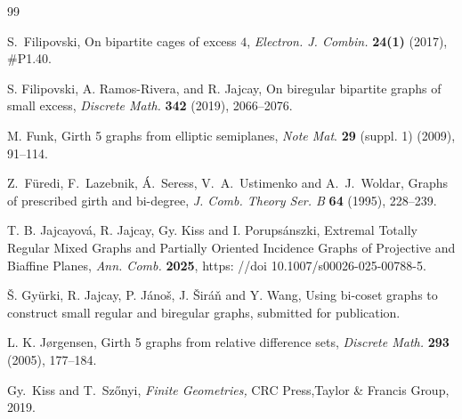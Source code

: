 \documentclass[a4paper,11pt]{article}
\begin{document}
\begin{thebibliography}{99}


S.\ Filipovski,
On bipartite cages of excess $4$,
{\em Electron. J. Combin.} {\bf 24(1)} (2017), \#P1.40.

S. Filipovski, A. Ramos-Rivera, and R. Jajcay, On biregular bipartite graphs of small excess,
{\em Discrete Math.} {\bf 342} (2019), 2066--2076. 


M. Funk,
Girth 5 graphs from elliptic semiplanes, 
{\em Note Mat}. {\bf 29} (suppl. 1) (2009), 91–114.

Z.\ F\" uredi, F.\ Lazebnik, \' A.\ Seress, V.\ A.\ Ustimenko and A.\ J.\ Woldar, 
Graphs of prescribed girth and bi-degree, 
{\em J. Comb. Theory Ser. B  } {\bf 64} (1995), 228--239.






T. B. Jajcayov{\'a}, R. Jajcay, Gy. Kiss and I. Porupsánszki,  
Extremal Totally Regular Mixed Graphs and Partially Oriented Incidence Graphs of Projective and Biaffine Planes, {\em Ann. Comb.} {\bf 2025},
https: //doi 10.1007/s00026-025-00788-5.

\v S. Gy\" urki, R. Jajcay, P. J\' ano\v s, J. \v Sir\' a\v n and Y. Wang, Using bi-coset graphs to construct 
small regular and biregular graphs, submitted for publication.



L. K. J\o rgensen, Girth 5 graphs from relative difference sets, \emph{Discrete Math.} 
{\bf 293} (2005), 177--184.


Gy.~Kiss and T.~Sz\H onyi, \emph{Finite Geometries,} CRC Press,Taylor \& Francis Group, 2019.


\end{thebibliography}
\end{document}
